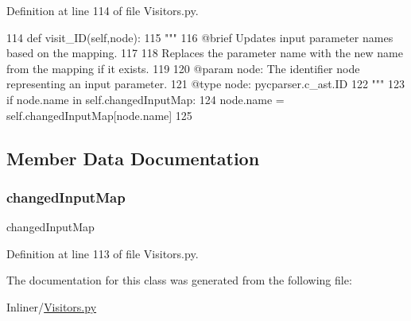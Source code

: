 Definition at line 114 of file Visitors.\+py.


\begin{DoxyCode}
114     \textcolor{keyword}{def }visit\_ID(self,node):
115         \textcolor{stringliteral}{"""
}
116 \textcolor{stringliteral}{        @brief Updates input parameter names based on the mapping.
}
117 \textcolor{stringliteral}{
}
118 \textcolor{stringliteral}{        Replaces the parameter name with the new name from the mapping if it exists.
}
119 \textcolor{stringliteral}{
}
120 \textcolor{stringliteral}{        @param node: The identifier node representing an input parameter.
}
121 \textcolor{stringliteral}{        @type node: pycparser.c\_ast.ID
}
122 \textcolor{stringliteral}{        """}
123         \textcolor{keywordflow}{if} node.name \textcolor{keywordflow}{in} self.changedInputMap:
124             node.name = self.changedInputMap[node.name]
125 
\end{DoxyCode}


\subsection{Member Data Documentation}
\mbox{\label{classVisitors_1_1InputParamModifier_a4ca1ea41a954d2675cd3c1915c9568e9}} 
\subsubsection{\texorpdfstring{changed\+Input\+Map}{changedInputMap}}
{\footnotesize\ttfamily changed\+Input\+Map}



Definition at line 113 of file Visitors.\+py.



The documentation for this class was generated from the following file\+:\begin{DoxyCompactItemize}
\item 
Inliner/\hyperlink{Visitors_8py}{Visitors.\+py}\end{DoxyCompactItemize}
